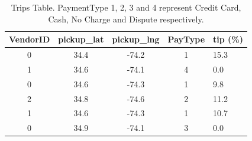 

\begin{table}
\small
\centering
\caption{\small Trips Table. PaymentType 1, 2, 3 and 4 represent Credit Card, Cash, No Charge and Dispute respectively.}
  \begin{tabular}{| c | c | c | c | l |}
    \hline
    {\bf VendorID} & \textbf{pickup\_lat} & \textbf{pickup\_lng} & \textbf{PayType} & \textbf{tip (\%)} \\ \hline
    0 & 34.4 & -74.2 & 1 & 15.3 \\ \hline
    1 & 34.6 & -74.1 & 4 & 0.0 \\ \hline
    0 & 34.6 & -74.3 & 1 & 9.8 \\ \hline
    2 & 34.8 & -74.6 & 2 & 11.2 \\ \hline
    1 & 34.6 & -74.3 & 1 & 10.7 \\ \hline
    0 & 34.9 & -74.1 & 3 & 0.0 \\
    \hline
  \end{tabular}
  \label{tbl:fact}
\end{table}


